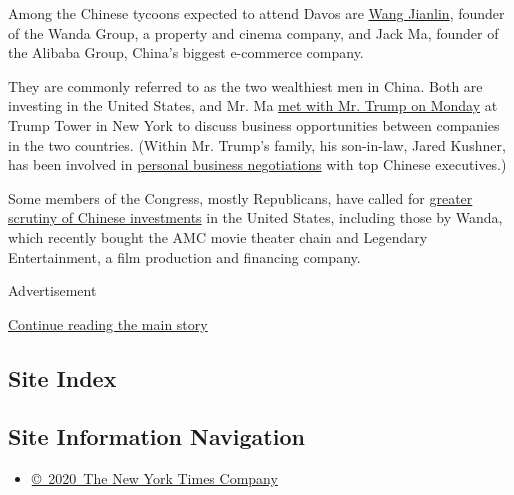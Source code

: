 Among the Chinese tycoons expected to attend Davos are
\href{https://www.nytimes3xbfgragh.onion/2015/04/29/world/asia/wang-jianlin-abillionaire-at-the-intersection-of-business-and-power-in-china.html}{Wang
Jianlin}, founder of the Wanda Group, a property and cinema company, and
Jack Ma, founder of the Alibaba Group, China's biggest e-commerce
company.

They are commonly referred to as the two wealthiest men in China. Both
are investing in the United States, and Mr. Ma
\href{http://www.reuters.com/article/us-usa-trump-alibaba-idUSKBN14T1ZA}{met
with Mr. Trump on Monday} at Trump Tower in New York to discuss business
opportunities between companies in the two countries. (Within Mr.
Trump's family, his son-in-law, Jared Kushner, has been involved in
\href{https://www.nytimes3xbfgragh.onion/2017/01/07/us/politics/jared-kushner-trump-business.html}{personal
business negotiations} with top Chinese executives.)

Some members of the Congress, mostly Republicans, have called for
\href{https://www.nytimes3xbfgragh.onion/2016/10/06/world/asia/china-congress-media-fdi.html}{greater
scrutiny of Chinese investments} in the United States, including those
by Wanda, which recently bought the AMC movie theater chain and
Legendary Entertainment, a film production and financing company.

Advertisement

\protect\hyperlink{after-bottom}{Continue reading the main story}

\hypertarget{site-index}{%
\subsection{Site Index}\label{site-index}}

\hypertarget{site-information-navigation}{%
\subsection{Site Information
Navigation}\label{site-information-navigation}}

\begin{itemize}
\tightlist
\item
  \href{https://help.nytimes3xbfgragh.onion/hc/en-us/articles/115014792127-Copyright-notice}{©~2020~The
  New York Times Company}
\end{itemize}


